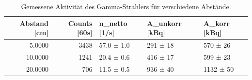 \begin{table}
\caption{Gemessene Aktivität des Gamma-Strahlers für verschiedene Abstände.}
\label{tab:aktivitaet_gamma}
\begin{tabular}{rrlll}
\toprule
Abstand [cm] & Counts [60s] & n_netto [1/s] & A_unkorr [kBq] & A_korr [kBq] \\
\midrule
5.0000 & 3438 & 57.0 ± 1.0 & 291 ± 18 & 570 ± 26 \\
10.0000 & 1241 & 20.4 ± 0.6 & 416 ± 17 & 599 ± 23 \\
20.0000 & 706 & 11.5 ± 0.5 & 936 ± 40 & 1132 ± 50 \\
\bottomrule
\end{tabular}
\end{table}
